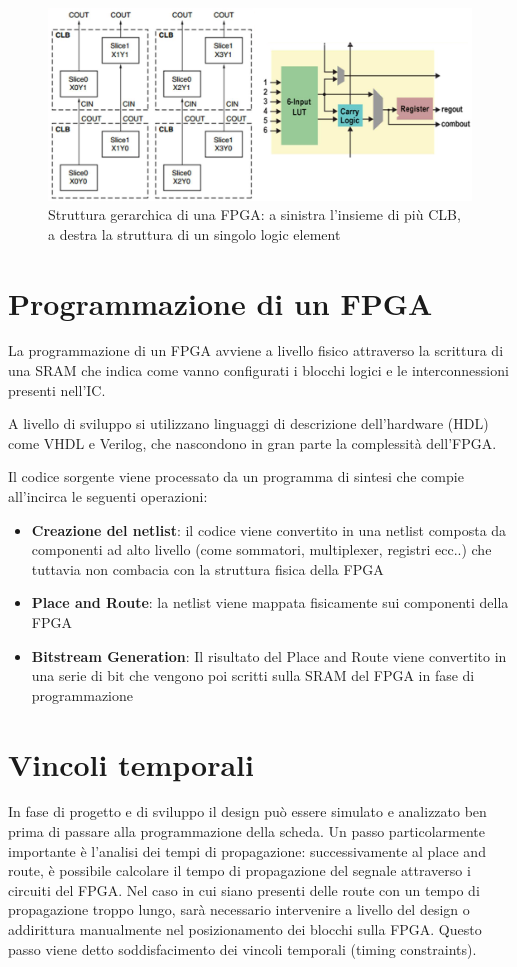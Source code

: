 \begin{figure}[hb]
	\centering
	\def\svgwidth{\columnwidth}
	\includegraphics[width=0.8\columnwidth]{TeX_files/CLB.png}
    \caption{Struttura gerarchica di una FPGA: a sinistra l'insieme di più CLB,
    a destra la struttura di un singolo logic element}
\end{figure}

\section{Programmazione di un FPGA}
La programmazione di un FPGA avviene a livello fisico attraverso
la scrittura di una SRAM che indica come vanno configurati i blocchi
logici e le interconnessioni presenti nell'IC.

A livello di sviluppo si utilizzano linguaggi di descrizione dell'hardware
(HDL) come VHDL e Verilog, che nascondono in gran parte la complessità
dell'FPGA.

Il codice sorgente viene processato da un programma di sintesi che compie
all'incirca le seguenti operazioni:

\begin{itemize}
    \item \textbf{Creazione del netlist}: il codice viene convertito in una
          netlist composta da componenti ad alto livello (come sommatori,
          multiplexer, registri ecc..) che tuttavia non combacia
          con la struttura fisica della FPGA
    \item \textbf{Place and Route}: la netlist viene mappata fisicamente sui
          componenti della FPGA
    \item \textbf{Bitstream Generation}: Il risultato del Place and Route viene
          convertito in una serie di bit che vengono poi scritti sulla SRAM
          del FPGA in fase di programmazione
\end{itemize}

\section{Vincoli temporali}
In fase di progetto e di sviluppo il design può essere simulato e analizzato
ben prima di passare alla programmazione della scheda.
Un passo particolarmente importante è l'analisi dei tempi di propagazione:
successivamente al place and route, è possibile calcolare il tempo di propagazione
del segnale attraverso i circuiti del FPGA. Nel caso in cui siano presenti
delle route con un tempo di propagazione troppo lungo, sarà necessario
intervenire a livello del design o addirittura manualmente nel posizionamento
dei blocchi sulla FPGA.
Questo passo viene detto soddisfacimento dei vincoli temporali (timing constraints).

